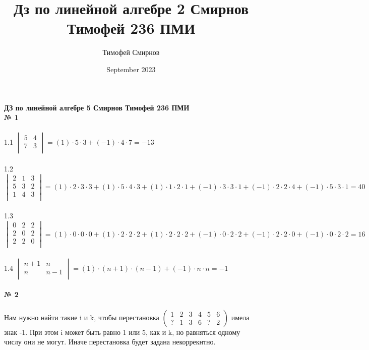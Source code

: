 \documentclass[a4paper, 12pt]{article}
\title{Дз по линейной алгебре 2 Смирнов Тимофей 236 ПМИ}
\author{Тимофей Смирнов}
\date{September 2023}
\begin{document}
    {\center \bf \large ДЗ по линейной алгебре 5 Смирнов Тимофей 236 ПМИ}
    \\ \textbf{№ 1} 
    \\
    \\ 1.1
        $ \begin{vmatrix}
            5 & 4 \\
            7 & 3 \\
        \end{vmatrix} = (1) \cdot 5 \cdot 3 + (-1) \cdot 4 \cdot 7 = -13$
    \\
    \\ 1.2 $ \begin{vmatrix}
        2 & 1 & 3 \\
        5 & 3 & 2 \\
        1 & 4 & 3 \\
    \end{vmatrix} = (1) \cdot 2 \cdot 3 \cdot 3 + (1) \cdot 5 \cdot 4 \cdot 3 + (1) \cdot 1 \cdot 2 \cdot 1 + (-1) \cdot 3 \cdot 3 \cdot 1 + (-1) \cdot 2 \cdot 2 \cdot 4 + (-1) \cdot 5 \cdot 3 \cdot 1 = 40$
    \\
    \\ 1.3 $\begin{vmatrix}
        0 & 2 & 2 \\
        2 & 0 & 2 \\
        2 & 2 & 0 \\
    \end{vmatrix} = (1) \cdot 0 \cdot 0 \cdot 0 + (1) \cdot 2 \cdot 2 \cdot 2 + (1) \cdot 2 \cdot 2 \cdot 2 + (-1) \cdot 0 \cdot 2 \cdot 2 + (-1) \cdot 2 \cdot 2 \cdot 0 + (-1) \cdot 0 \cdot 2 \cdot 2 = 16$
    \\
    \\ 1.4 $\begin{vmatrix}
        n + 1 & n \\
        n & n - 1 \\
    \end{vmatrix} = (1) \cdot (n + 1) \cdot (n - 1) + (-1) \cdot n \cdot n = -1$
    \\
    \\ \textbf{№ 2}
    \\
    \\ Нам нужно найти такие i и k, чтобы перестановка $\begin{pmatrix}1 & 2 & 3 & 4 & 5 & 6 \\ ? & 1 & 3 & 6 & ? & 2 \end{pmatrix}$ имела знак -1. При этом i может быть равно 1 или 5, как и k, но равняться одному числу они не могут. Иначе перестановка будет задана некоррекнтно.
\end{document}
